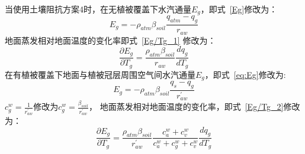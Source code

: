 当使用土壤阻抗方案4时，在无植被覆盖下水汽通量\(E_{g}\)，即式~\eqref{Eg}修改为：
\begin{equation}\label{Eg_modify}
E_{g}=-\rho_{atm}\beta_{soil} \frac{q_{atm}-q_{g}}{r_{a w}}
\end{equation}
地面蒸发相对地面温度的变化率即式~\eqref{Eg/Tg_1} 修改为：
\begin{equation}
     \frac{\partial E_{g}}{\partial T_{g}}= \frac{\rho_{atm} \beta_{soil}}{r_{a w} } \frac{d q_{g}}{d T_{g}}
\end{equation}
在有植被覆盖下地面与植被冠层周围空气间水汽通量\(E_{g}\)，即式~\eqref{eq:Eg}修改为:
\begin{equation}
E_{g}=-\rho_{atm} \beta_{soil} \frac{q_{s}-q_{g}}{r_{a w}^{\prime}}
\end{equation}
$c_g^w=\frac{1}{r_{aw}^\prime}$修改为$c_g^w=\frac{\beta_{soil}}{r_{aw}^\prime}$，
地面蒸发相对地面温度的变化率，即式~\eqref{Eg/Tg_2}修改为：
\begin{equation}
\frac{\partial E_{g}}{\partial T_{g}}=
      \frac{\rho_{atm} \beta_{soil}}{r_{a w}^{\prime}} \frac{c_{a}^{w}+c_{v}^{w}}{c_{a}^{w}+c_{g}^{w}+c_{v}^{w}} \frac{d q_{g}}{d T_{g}}
\end{equation}